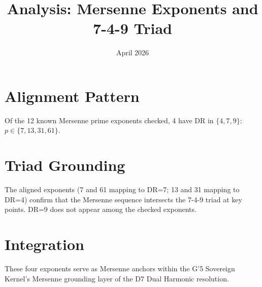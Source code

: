 \documentclass{article}
\title{Analysis: Mersenne Exponents and 7-4-9 Triad}
\date{April 2026}
\begin{document}
\maketitle

\section{Alignment Pattern}
Of the 12 known Mersenne prime exponents checked, 4 have DR in $\{4,7,9\}$: $p \in \{7,13,31,61\}$.

\section{Triad Grounding}
The aligned exponents (7 and 61 mapping to DR=7; 13 and 31 mapping to DR=4) confirm that the Mersenne sequence intersects the 7-4-9 triad at key points. DR=9 does not appear among the checked exponents.

\section{Integration}
These four exponents serve as Mersenne anchors within the G'5 Sovereign Kernel's Mersenne grounding layer of the D7 Dual Harmonic resolution.
\end{document}
